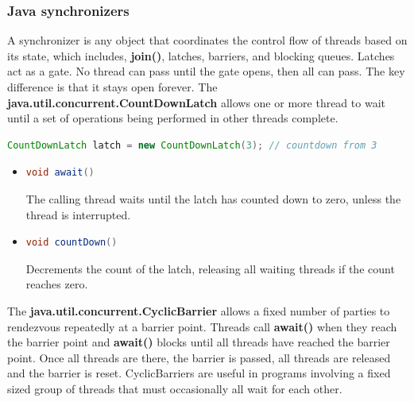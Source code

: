 \documentclass[11pt]{article}
\begin{document}
\subsubsection{Java synchronizers}
A synchronizer is any object that coordinates the control flow of threads based on its state, which includes, \textbf{join()}, latches, barriers, and blocking queues.
Latches act as a gate. No thread can pass until the gate opens, then all can pass. The key difference is that it stays open forever.
The \textbf{java.util.concurrent.CountDownLatch} allows one or more thread to wait until a set of operations being performed in other threads complete.
\begin{lstlisting}[language=Java]
CountDownLatch latch = new CountDownLatch(3); // countdown from 3
\end{lstlisting}
\begin{itemize}
    \item \begin{lstlisting}[language=Java]
void await()        
\end{lstlisting}
The calling thread waits until the latch has counted down to zero, unless the thread is interrupted.
    \item \begin{lstlisting}[language=Java]
void countDown()        
\end{lstlisting}
Decrements the count of the latch, releasing all waiting threads if the count reaches zero.
\end{itemize}
The \textbf{java.util.concurrent.CyclicBarrier} allows a fixed number of parties to rendezvous repeatedly at a barrier point.
Threads call \textbf{await()} when they reach the barrier point and \textbf{await()} blocks until all threads have reached the barrier point.
Once all threads are there, the barrier is passed, all threads are released and the barrier is reset. 
CyclicBarriers are useful in programs involving a fixed sized group of threads that must occasionally all wait for each other.
\end{document}
